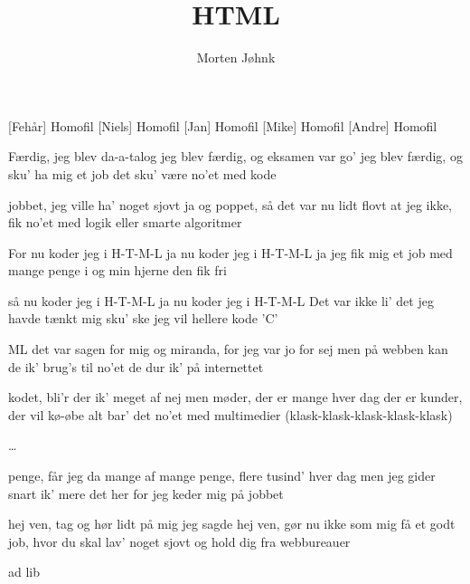 \documentclass[danish]{article}
\title{HTML}
\author{Morten Jøhnk}
\begin{document}
\maketitle

\begin{roles}
  [Fehår] Homofil
  [Niels] Homofil
  [Jan] Homofil
  [Mike] Homofil
  [Andre] Homofil
\end{roles}

\begin{song}

 Færdig, jeg blev da-a-talog
	jeg blev færdig, og eksamen var go'
	jeg blev færdig, og sku' ha mig et job
	det sku' være no'et med kode

 jobbet, jeg ville ha' noget sjovt
	ja og poppet, så det var nu lidt flovt
	at jeg ikke, fik no'et med logik
	eller smarte algoritmer

 For nu koder jeg i H-T-M-L
	ja nu koder jeg i H-T-M-L
	ja jeg fik mig et job
	med mange penge i
	og min hjerne den fik fri

	så nu koder jeg i H-T-M-L
	ja nu koder jeg i H-T-M-L
	Det var ikke li' det
	jeg havde tænkt mig sku' ske
	jeg vil hellere kode 'C'

 ML det var sagen for mig
	og miranda, for jeg var jo for sej
	men på webben kan de ik' brug's til no'et
	de dur ik' på internettet

 kodet, bli'r der ik' meget af
	nej men møder, der er mange hver dag
	der er kunder, der vil kø-øbe alt
	bar' det no'et med multimedier (klask-klask-klask-klask-klask)

 \ldots

 penge, får jeg da mange af
	mange penge, flere tusind' hver dag
	men jeg gider snart ik' mere det her
	for jeg keder mig på jobbet

 hej ven, tag og hør lidt på mig
	jeg sagde hej ven, gør nu ikke som mig
	få et godt job, hvor du skal lav' noget sjovt
	og hold dig fra webbureauer

 ad lib

\end{song}
\end{document}
